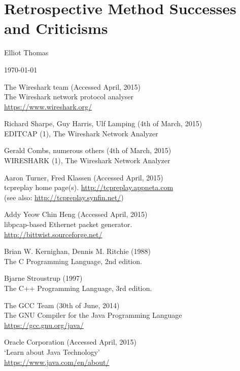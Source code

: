 \documentclass[10pt,a4paper,notitlepage]{report}
\begin{document}
\section{Retrospective Method Successes and Criticisms}



\begin{center}
Elliot Thomas

\today
\end{center}


\begin{thebibliography}{99}
	The Wireshark team (Accessed April, 2015)\\
	The Wireshark network protocol analyser\\
	\url{https://www.wireshark.org/}

    Richard Sharpe, Guy Harris, Ulf Lamping (4th of March, 2015)\\
    EDITCAP (1), The Wireshark Network Analyzer

    Gerald Combs, numerous others (4th of March, 2015)\\
    WIRESHARK (1), The Wireshark Network Analyzer

    Aaron Turner, Fred Klassen (Accessed April, 2015)\\
    tcpreplay home page(s).
    \url{http://tcpreplay.appneta.com}\\
    (see also: \url{http://tcpreplay.synfin.net/})

    Addy Yeow Chin Heng (Accessed April, 2015)\\
    libpcap-based Ethernet packet generator.\\
    \url{http://bittwist.sourceforge.net/}

	Brian W. Kernighan, Dennis M. Ritchie (1988)\\
	The C Programming Language, 2nd edition.

	Bjarne Stroustrup (1997)\\
	The C++ Programming Language, 3rd edition.

	The GCC Team (30th of June, 2014)\\
	The GNU Compiler for the Java Programming Language\\
	\url{https://gcc.gnu.org/java/}

	Oracle Corporation (Accessed April, 2015)\\
	`Learn about Java Technology'\\
	\url{https://www.java.com/en/about/}


\end{thebibliography}
\end{document}
